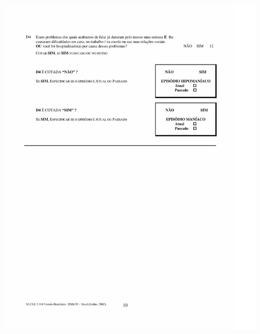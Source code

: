 \documentclass[chapter=TITLE,
               oneside,
               12pt,
               a4paper,
               english,
               brazil]{abntex2}    %
\begin{document}
\begin{anexosenv}
        \begin{center}
        \includegraphics[width=1\textwidth]{img/modulominimania02.pdf}
        \end{center}

\end{anexosenv}
\end{document}
